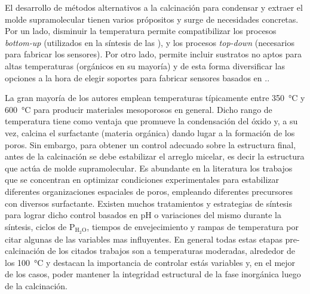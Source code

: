 	El desarrollo de métodos alternativos a la calcinación para condensar y extraer el molde supramolecular tienen varios própositos y surge de necesidades concretas. Por un lado, disminuir la temperatura permite compatibilizar los procesos \textit{bottom-up} (utilizados en la síntesis de las \pdm), y los procesos \textit{top-down} (necesarios para fabricar los sensores). Por otro lado, permite incluir sustratos no aptos para altas temperaturas (orgánicos en su mayoría) y de esta forma diversificar las opciones a la hora de elegir soportes para fabricar sensores basados en \pdm.\cite{Doshi2000a,Wagner2013,Innocenzi2013,Soler-Illia2002a,Zhang2005}.

	La gran mayoría de los autores emplean temperaturas típicamente entre \SI{350}{\celsius} y \SI{600}{\celsius} para producir materiales mesoporosos en general.\cite{Kresge1992,Beck1992,DiRenzo1997}  Dicho rango de temperatura tiene como ventaja que promueve la condensación del óxido y, a su vez, calcina el surfactante (materia orgánica) dando lugar a la formación de los poros. Sin embargo, para obtener un control adecuado sobre la estructura final, antes de la calcinación se debe estabilizar el arreglo micelar, es decir la estructura que actúa de molde supramolecular. Es abundante en la literatura los trabajos que se concentran en optimizar condiciones experimentales para estabilizar diferentes organizaciones espaciales de poros, empleando diferentes precursores con diversos surfactante\cite{Huo1996,Herregods2013,Grosso2001}. Existen muchos tratamientos y estrategias de síntesis para lograr dicho control basados en pH o variaciones del mismo durante la síntesis\cite{Doshi2000a,Soler-Illia2011,Boissiere2000,Huo1996,GonzalezSolveyra2017,Ichinose2002}, ciclos de P$_\text{H$_2$O}$\cite{Cagnol2002,Soler-Illia2012}, tiempos de envejecimiento\cite{Malfatti2009,Grosso2001} y rampas de temperatura\cite{Huang2002,Andrini2016,Soler-Illia2006,Rohlfing2005} por citar algunas de las variables mas influyentes. En general todas estas etapas pre-calcinación de los citados trabajos son a temperaturas moderadas, alrededor de los \SI{100}{\celsius} y destacan la importancia de controlar estás variables y, en el mejor de los casos, poder mantener la integridad estructural de la fase inorgánica luego de la calcinación. 

